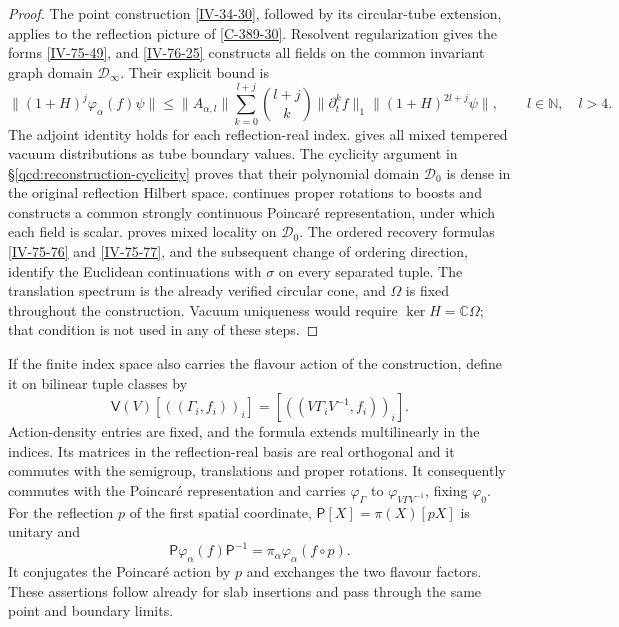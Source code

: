 \documentclass[11pt,letterpaper,reqno]{amsart}
\theoremstyle{definition}
\theoremstyle{remark}
\begin{document}
\begin{proof}
The point construction \cref{IV-34-30}, followed by its
circular-tube extension, applies to the reflection picture
of \cref{C-389-30}. Resolvent regularization gives the
forms \eqref{IV-75-49}, and \cref{IV-76-25} constructs
all fields on the common invariant graph domain
$\mathcal D_\infty$. Their explicit bound is
\[
 \|(1+H)^j\varphi_\alpha(f)\psi\|
 \le\|A_{\alpha,l}\|
   \sum_{k=0}^{l+j}\binom{l+j}{k}\|\partial_t^kf\|_1
                         \|(1+H)^{2l+j}\psi\|,
 \qquad l\in\mathbb N,\quad l>4.
\]
The adjoint identity holds for each reflection-real index.
 gives all mixed
tempered vacuum distributions as tube boundary values.
The cyclicity argument in
\S\ref{qcd:reconstruction-cyclicity} proves that their
polynomial domain $\mathcal D_0$ is dense in the original
reflection Hilbert space.
 continues proper rotations to boosts and
constructs a common strongly continuous Poincar\'e
representation, under which each field is scalar.
 proves mixed locality on $\mathcal D_0$.
The ordered recovery formulas \eqref{IV-75-76} and
\eqref{IV-75-77}, and the subsequent change of ordering
direction, identify the Euclidean continuations with
$\sigma$ on every separated tuple. The translation
spectrum is the already verified circular cone, and
$\Omega$ is fixed throughout the construction.
Vacuum uniqueness would require $\ker H=\mathbb C\Omega$;
that condition is not used in any of these steps.
\end{proof}

If the finite index space also carries the flavour action
of the construction, define it on bilinear tuple classes by
\[
 \mathsf V(V)[((\Gamma_i,f_i))_i]
              =[((V\Gamma_iV^{-1},f_i))_i].
\]
Action-density entries are fixed, and the formula extends
multilinearly in the indices. Its matrices in the
reflection-real basis are real orthogonal and it
commutes with the semigroup, translations and proper
rotations.  It consequently commutes with the
Poincar\'e representation and carries
$\varphi_\Gamma$ to $\varphi_{V\Gamma V^{-1}}$,
fixing $\varphi_0$.  For the reflection $p$ of the
first spatial coordinate,
$\mathsf P[X]=\pi(X)[pX]$ is unitary and
\[
 \mathsf P\varphi_\alpha(f)\mathsf P^{-1}
          =\pi_\alpha\varphi_\alpha(f\circ p).
\]
It conjugates the Poincar\'e action by $p$ and
exchanges the two flavour factors.  These assertions
follow already for slab insertions and pass through
the same point and boundary limits.
\end{document}
